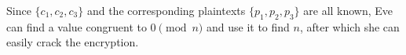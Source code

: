 \begin{problem}
\begin{enumerate}
\begin{Answer}
\noindent
Since $\{c_1, c_2, c_3\}$ and the corresponding plaintexts $\{p_1, p_2, p_3\}$ are all known,
Eve can find a value congruent to $0 \pmod n$
and use it to find $n$, after which she can easily crack the encryption.

\end{Answer}
\end{enumerate}
\end{problem}

